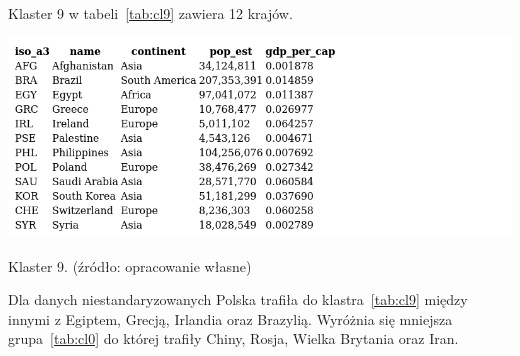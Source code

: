 \documentclass[11pt]{report}
\begin{document}
    Klaster 9 w tabeli~\ref{tab:cl9} zawiera 12 krajów.
    \begin{table}[!htp]
        \centering
        \includegraphics[width=\linewidth]{tables/CLUST/clust9kmeans.png}
        \caption{Klaster 9. (źródło: opracowanie własne)}
        \label{tab:cl9}
    \end{table}

    Dla danych niestandaryzowanych Polska trafiła do klastra~\ref{tab:cl9} między innymi z Egiptem, Grecją, Irlandia oraz Brazylią.
    Wyróżnia się mniejsza grupa~\ref{tab:cl0} do której trafiły Chiny, Rosja, Wielka Brytania oraz Iran.


    \newpage
    \printbibliography[title={Bibliografia}]
\end{document}
